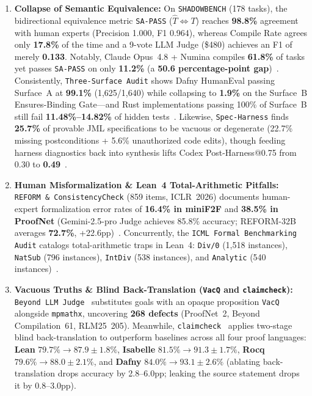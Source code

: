 \documentclass[10pt,twocolumn]{article}
\begin{document}
\begin{enumerate}
  \item \textbf{Collapse of Semantic Equivalence:} On \texttt{SHADOWBENCH} (178 tasks), the bidirectional equivalence metric \texttt{SA-PASS} ($\hat{T} \iff T$) reaches \textbf{98.8\%} agreement with human experts (Precision 1.000, F1 0.964), whereas Compile Rate agrees only \textbf{17.8\%} of the time and a 9-vote LLM Judge (\$480) achieves an F1 of merely \textbf{0.133}. Notably, Claude Opus~4.8 + Numina compiles \textbf{61.8\%} of tasks yet passes \texttt{SA-PASS} on only \textbf{11.2\%} (a \textbf{50.6 percentage-point gap})~\cite{han2026shadowbench}. Consistently, \texttt{Three-Surface Audit} shows Dafny HumanEval passing Surface~A at \textbf{99.1\%} (1,625/1,640) while collapsing to \textbf{1.9\%} on the Surface~B Ensures-Binding Gate---and Rust implementations passing 100\% of Surface~B still fail \textbf{11.48\%--14.82\%} of hidden tests~\cite{threesurface2026}. Likewise, \texttt{Spec-Harness} finds \textbf{25.7\%} of provable JML specifications to be vacuous or degenerate (22.7\% missing postconditions + 5.6\% unauthorized code edits), though feeding harness diagnostics back into synthesis lifts Codex Post-Harness@0.75 from 0.30 to \textbf{0.49}~\cite{misu2026specharness}.
  \item \textbf{Human Misformalization \& Lean~4 Total-Arithmetic Pitfalls:} \texttt{REFORM \& ConsistencyCheck} (859 items, ICLR~2026) documents human-expert formalization error rates of \textbf{16.4\% in miniF2F} and \textbf{38.5\% in ProofNet} (Gemini-2.5-pro Judge achieves 85.8\% accuracy; REFORM-32B averages \textbf{72.7\%}, +22.6pp)~\cite{chen2026reform}. Concurrently, the \texttt{ICML Formal Benchmarking Audit} catalogs total-arithmetic traps in Lean~4: \texttt{Div/0} (1,518 instances), \texttt{NatSub} (796 instances), \texttt{IntDiv} (538 instances), and \texttt{Analytic} (540 instances)~\cite{ammanamanchi2026faults}.
  \item \textbf{Vacuous Truths \& Blind Back-Translation (\texttt{VacQ} and \texttt{claimcheck}):} \texttt{Beyond LLM Judge}~\cite{mei2026beyondllm} substitutes goals with an opaque proposition \texttt{VacQ} alongside \texttt{mpmathx}, uncovering \textbf{268 defects} (ProofNet~2, Beyond Compilation~61, RLM25~205). Meanwhile, \texttt{claimcheck}~\cite{amster2026claimcheck} applies two-stage blind back-translation to outperform baselines across all four proof languages: \textbf{Lean} $79.7\% \to \mathbf{87.9 \pm 1.8\%}$, \textbf{Isabelle} $81.5\% \to \mathbf{91.3 \pm 1.7\%}$, \textbf{Rocq} $79.6\% \to \mathbf{88.0 \pm 2.1\%}$, and \textbf{Dafny} $84.0\% \to \mathbf{93.1 \pm 2.6\%}$ (ablating back-translation drops accuracy by 2.8--6.0pp; leaking the source statement drops it by 0.8--3.0pp).

\end{enumerate}
\end{document}
